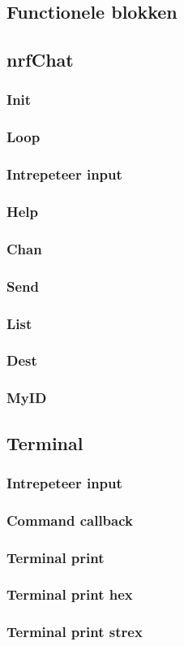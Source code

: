 \subsection{Functionele blokken}

\subsection{nrfChat}
    \subsubsection{Init}
    \subsubsection{Loop}
    \subsubsection{Intrepeteer input}
    \subsubsection{Help}
    \subsubsection{Chan}
    \subsubsection{Send}
    \subsubsection{List}
    \subsubsection{Dest}
    \subsubsection{MyID}

\subsection{Terminal}
    \subsubsection{Intrepeteer input}
    \subsubsection{Command callback}
    \subsubsection{Terminal print}
    \subsubsection{Terminal print hex}
    \subsubsection{Terminal print strex}
